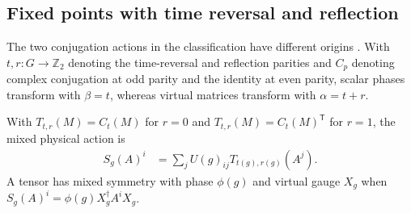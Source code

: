 \subsection{Fixed points with time reversal and reflection}
\label{sec:spt_mixed_fixed_points}

The two conjugation actions in the classification have different origins
\cite[Section~III.A, local TeX lines~1120--1130]{Cirac2021Matrix}.
With $t,r:G\to\mathbb Z_2$ denoting the time-reversal and reflection parities
and $C_p$ denoting complex conjugation at odd parity and the identity at even
parity, scalar phases transform with $\beta=t$, whereas virtual matrices
transform with $\alpha=t+r$.

\begin{definition}
    \label{def:spt_mixed_tensor_symmetry}
    \leanok
    With $T_{t,r}(M)=C_t(M)$ for $r=0$ and
    $T_{t,r}(M)=C_t(M)^{\mathsf T}$ for $r=1$, the mixed physical action is
    \begin{align}
        S_g(A)^i & =\sum_j U(g)_{ij}T_{t(g),r(g)}(A^j).
        \label{eq:spt_mixed_tensor_action}
    \end{align}
    A tensor has mixed symmetry with phase $\phi(g)$ and virtual gauge $X_g$
    when $S_g(A)^i=\phi(g)X_g^\dagger A^iX_g$.
\end{definition}


